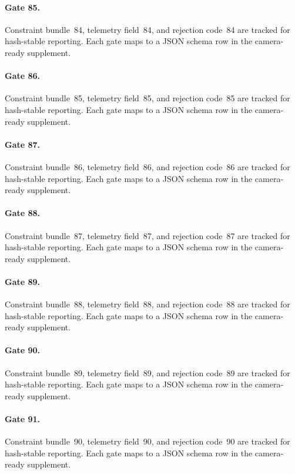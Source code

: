 \documentclass[sigconf,nonacm]{acmart}
\begin{document}
\paragraph{Gate 85.}
Constraint bundle~84, telemetry field~84, and rejection code~84 are tracked for hash-stable reporting. Each gate maps to a JSON schema row in the camera-ready supplement. %

\paragraph{Gate 86.}
Constraint bundle~85, telemetry field~85, and rejection code~85 are tracked for hash-stable reporting. Each gate maps to a JSON schema row in the camera-ready supplement. %

\paragraph{Gate 87.}
Constraint bundle~86, telemetry field~86, and rejection code~86 are tracked for hash-stable reporting. Each gate maps to a JSON schema row in the camera-ready supplement. %

\paragraph{Gate 88.}
Constraint bundle~87, telemetry field~87, and rejection code~87 are tracked for hash-stable reporting. Each gate maps to a JSON schema row in the camera-ready supplement. %

\paragraph{Gate 89.}
Constraint bundle~88, telemetry field~88, and rejection code~88 are tracked for hash-stable reporting. Each gate maps to a JSON schema row in the camera-ready supplement. %

\paragraph{Gate 90.}
Constraint bundle~89, telemetry field~89, and rejection code~89 are tracked for hash-stable reporting. Each gate maps to a JSON schema row in the camera-ready supplement. %

\paragraph{Gate 91.}
Constraint bundle~90, telemetry field~90, and rejection code~90 are tracked for hash-stable reporting. Each gate maps to a JSON schema row in the camera-ready supplement. %
\end{document}
